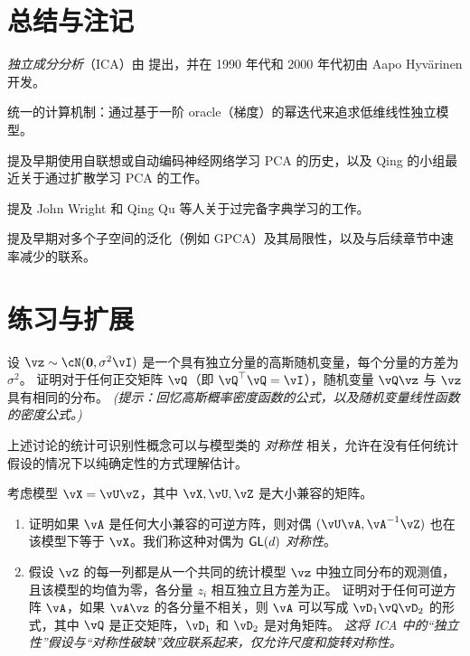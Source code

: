\documentclass[../../book-main_zh.tex]{subfiles}
\begin{document}
\section{总结与注记}


\textit{独立成分分析}（ICA）由 \cite{Ans-1985} 提出，并在 1990 年代和 2000 年代初由 Aapo Hyv\"{a}rinen 开发。

统一的计算机制：通过基于一阶 oracle（梯度）的幂迭代来追求低维线性独立模型。

提及早期使用自联想或自动编码神经网络学习 PCA 的历史，以及 Qing 的小组最近关于通过扩散学习 PCA 的工作。

提及 John Wright 和 Qing Qu 等人关于过完备字典学习的工作。

提及早期对多个子空间的泛化（例如 GPCA）及其局限性，以及与后续章节中速率减少的联系。

\section{练习与扩展}

\begin{exercise}\label{exercise:gaussian-rot-invar}
    设 $\vz \sim \cN(\Zero, \sigma^2 \vI)$ 是一个具有独立分量的高斯随机变量，每个分量的方差为 $\sigma^2$。
    证明对于任何正交矩阵 $\vQ$（即 $\vQ^\top \vQ = \vI$），随机变量 $\vQ \vz$ 与 $\vz$ 具有相同的分布。
    \textit{(提示：回忆高斯概率密度函数的公式，以及随机变量线性函数的密度公式。)}
\end{exercise}

\begin{exercise}\label{exercise:symmetry-identifiability}
    上述讨论的统计可识别性概念可以与模型类的 \textit{对称性} 相关，允许在没有任何统计假设的情况下以纯确定性的方式理解估计。


考虑模型 $\vX = \vU \vZ$，其中 $\vX, \vU, \vZ$ 是大小兼容的矩阵。
    \begin{enumerate}
        \item 证明如果 $\vA$ 是任何大小兼容的可逆方阵，则对偶 $(\vU \vA, \vA^{-1} \vZ)$ 也在该模型下等于 $\vX$。我们称这种对偶为 \textit{$\mathsf{GL}(d)$ 对称性}。
        \item 假设 $\vZ$ 的每一列都是从一个共同的统计模型 $\vz$ 中独立同分布的观测值，且该模型的均值为零，各分量 $z_i$ 相互独立且方差为正。
        证明对于任何可逆方阵 $\vA$，如果 $\vA \vz$ 的各分量不相关，则 $\vA$ 可以写成 $\vD_1 \vQ \vD_2$ 的形式，其中 $\vQ$ 是正交矩阵，$\vD_1$ 和 $\vD_2$ 是对角矩阵。
        \textit{这将 ICA 中的“独立性”假设与“对称性破缺”效应联系起来，仅允许尺度和旋转对称性。}
    \end{enumerate}

\end{exercise}
\end{document}
